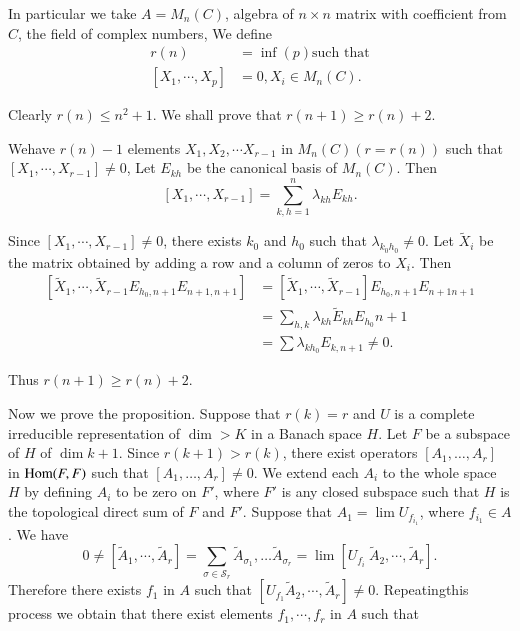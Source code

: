 In particular we take $A=M_n(C)$, algebra  of $n \times n$ matrix with
coefficient from $C$, the field of complex numbers, We define     
\begin{align*}
  r(n) & = \inf(p) \text {such that}\\
  [X_1,\cdots, X_p]&=0, X_i \in M_n(C).
\end{align*}  

Clearly $r(n)\le n^2 +1$. We shall prove that $r(n+1)\ge r(n)+2$. 
                 
We\pageoriginale have $r(n)-1$ elements $X_1, X_2,\cdots X_{r-1}$ in
$M_n(C)(r=r(n))$ such that $[X_1,\cdots,X_{r-1}]\neq 0$, Let $E_{kh}$
be the canonical basis of $M_n(C)$. Then 
$$
[X_1,\cdots,X_{r-1}]=\sum  ^{n}_{k,h=1} \lambda_{kh} E_{kh}.
$$               

Since $[X_1,\cdots, X_{r-1}]\neq 0$, there exists $k_0$ and $h_0$ such
that $\lambda _{k_0h_0} \neq 0$. Let $\tilde{X}_i$ be the matrix
obtained by adding a row and a column of zeros to $X_i$. Then               
\begin{align*}
  \left[\tilde{X}_1,\cdots,\tilde{X}_{r-1}E_{h_0,n+1} E_{n+1,n+1}\right] 
  &=\left[\tilde {X}_1,\cdots, \tilde{X}_{r-1}\right] E_{h_0, n+1}E_{n+1n+1}\\
  &=\sum _{h,k}\lambda_{kh} \tilde{E}_{kh} E_{h_0} n+1\\
&=\sum\lambda_{kh_0} E_{k,n+1}\neq 0. 
\end{align*}    
                 
Thus $r(n+1)\ge r(n)+2$.
                 
Now we prove the proposition. Suppose that $r(k)=r$ and $U$ is a
complete irreducible representation of $\dim > K$ in a Banach
space $H$. Let $F$ be a subspace of $H$ of $\dim k+1$. Since
$r(k+1)> r(k)$,  there exist operators $[A_1, \ldots, A_r]$ in $\operatorname{Hom}
(F, F)$ such that $[A_1,\ldots, A_r] \neq
0$. We extend each $A_i$ to the whole space $H$ by defining $A_i$ to
be zero on $F'$, where $F'$ is any closed subspace such that $H$ is
the topological direct sum of $F$ and $F'$. Suppose that $A_1=\lim
U_{f_{i_1}}$, where $f_{i_1}\in A$. We have 
$$
0\neq [\tilde{A}_1,\cdots, \tilde{A}_r]= \sum\limits_{\sigma \in
 \mathcal{S}_r} \tilde{A}_{\sigma_1}, \ldots \tilde{A}_{\sigma_r}=
\lim [U_{f_i}~\tilde {A}_2,\cdots, \tilde{A}_r].
$$ 
Therefore there exists $f_1$ in $A$
such that $[U_{f_1} \tilde {A}_2,\cdots, \tilde{A}_r]\neq 0$.
Repeating\pageoriginale this process we obtain that there exist elements
$f_1,\cdots,f_r$ in $A$ such that 

